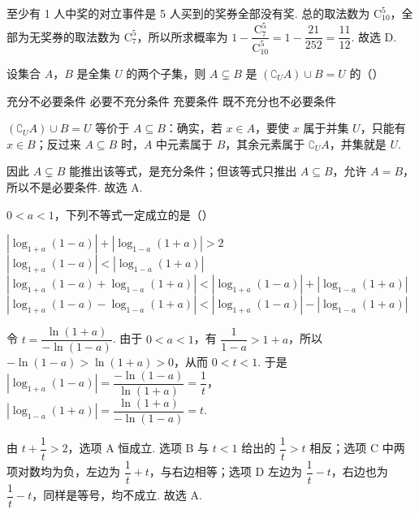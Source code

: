 \begin{solution}
至少有 1 人中奖的对立事件是 5 人买到的奖券全部没有奖. 总的取法数为 \(\mathrm C_{10}^{5}\)，全部为无奖券的取法数为 \(\mathrm C_{7}^{5}\)，所以所求概率为
\(1-\dfrac{\mathrm C_{7}^{5}}{\mathrm C_{10}^{5}}=1-\dfrac{21}{252}=\dfrac{11}{12}\). 故选 D.
\end{solution}

\begin{problem}
设集合 \(A\)，\(B\) 是全集 \(U\) 的两个子集，则 \(A \subsetneq B\) 是 \((\complement_U A) \cup B = U\) 的（\quad）

\choices
    {充分不必要条件}
    {必要不充分条件}
    {充要条件}
    {既不充分也不必要条件}
\end{problem}

\begin{solution}
\((\complement_U A)\cup B=U\) 等价于 \(A\subseteq B\)：确实，若 \(x\in A\)，要使 \(x\) 属于并集 \(U\)，只能有 \(x\in B\)；反过来 \(A\subseteq B\) 时，\(A\) 中元素属于 \(B\)，其余元素属于 \(\complement_U A\)，并集就是 \(U\).

因此 \(A\subsetneq B\) 能推出该等式，是充分条件；但该等式只推出 \(A\subseteq B\)，允许 \(A=B\)，所以不是必要条件. 故选 A.
\end{solution}

\begin{problem}
\(0<a<1\)，下列不等式一定成立的是（\quad）

\choices
    {\(\left|\log_{1+a}(1-a)\right|+\left|\log_{1-a}(1+a)\right|>2\)}
    {\(\left|\log_{1+a}(1-a)\right|<\left|\log_{1-a}(1+a)\right|\)}
    {\(\left|\log_{1+a}(1-a)+\log_{1-a}(1+a)\right|<\left|\log_{1+a}(1-a)\right|+\left|\log_{1-a}(1+a)\right|\)}
    {\(\left|\log_{1+a}(1-a)-\log_{1-a}(1+a)\right|<\left|\log_{1+a}(1-a)\right|-\left|\log_{1-a}(1+a)\right|\)}
\end{problem}

\begin{solution}
令 \(t=\dfrac{\ln(1+a)}{-\ln(1-a)}\). 由于 \(0<a<1\)，有
\(\dfrac{1}{1-a}>1+a\)，所以 \(-\ln(1-a)>\ln(1+a)>0\)，从而 \(0<t<1\). 于是
\(\left|\log_{1+a}(1-a)\right|=\dfrac{-\ln(1-a)}{\ln(1+a)}=\dfrac{1}{t}\)，
\(\left|\log_{1-a}(1+a)\right|=\dfrac{\ln(1+a)}{-\ln(1-a)}=t\).

由 \(t+\dfrac{1}{t}>2\)，选项 A 恒成立. 选项 B 与 \(t<1\) 给出的 \(\dfrac{1}{t}>t\) 相反；选项 C 中两项对数均为负，左边为 \(\dfrac{1}{t}+t\)，与右边相等；选项 D 左边为 \(\dfrac{1}{t}-t\)，右边也为 \(\dfrac{1}{t}-t\)，同样是等号，均不成立. 故选 A.
\end{solution}

